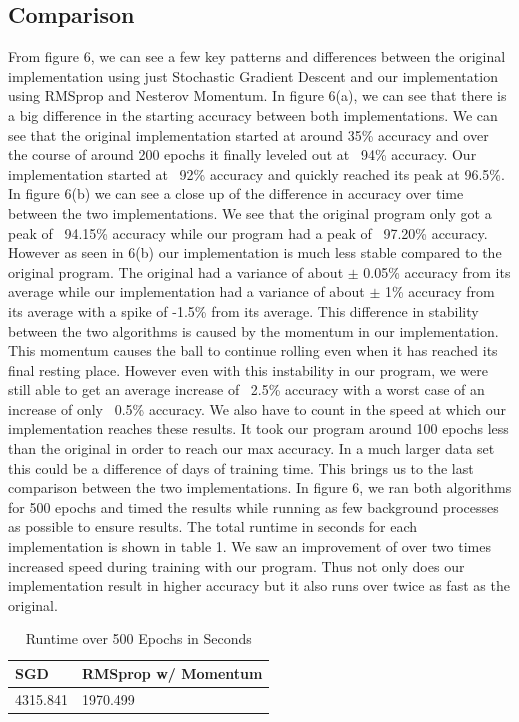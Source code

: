 \documentclass[12pt]{article}
\theoremstyle{definition}
\theoremstyle{plain}
\begin{document}
\subsection{Comparison}
From figure 6, we can see a few key patterns and differences between the original implementation using just Stochastic Gradient Descent and our implementation using RMSprop and Nesterov Momentum. In figure 6(a), we can see that there is a big difference in the starting accuracy between both implementations. We can see that the original implementation started at around 35\% accuracy and over the course of around 200 epochs it finally leveled out at ~94\% accuracy. Our implementation started at ~92\% accuracy and quickly reached its peak at 96.5\%. In figure 6(b) we can see a close up of the difference in accuracy over time between the two implementations. We see that the original program only got a peak of ~94.15\% accuracy while our program had a peak of ~97.20\% accuracy. However as seen in 6(b) our implementation is much less stable compared to the original program. The original had a variance of about $\pm$ 0.05\% accuracy from its average while our implementation had a variance of about $\pm$ 1\% accuracy from its average with a spike of -1.5\% from its average. This difference in stability between the two algorithms is caused by the momentum in our implementation. This momentum causes the ball to continue rolling even when it has reached its final resting place. However even with this instability in our program, we were still able to get an average increase of ~2.5\% accuracy with a worst case of an increase of only ~0.5\% accuracy. We also have to count in the speed at which our implementation reaches these results. It took our program around 100 epochs less than the original in order to reach our max accuracy. In a much larger data set this could be a difference of days of training time. This brings us to the last comparison between the two implementations. In figure 6, we ran both algorithms for 500 epochs and timed the results while running as few background processes as possible to ensure results. The total runtime in seconds for each implementation is shown in table 1. We saw an improvement of over two times increased speed during training with our program. Thus not only does our implementation result in higher accuracy but it also runs over twice as fast as the original. 
\begin{table}
\caption{Runtime over 500 Epochs in Seconds}
\begin{center}
\begin{tabular}{p{}|p{}}
SGD & RMSprop w/ Momentum\\
\hline
4315.841 & 1970.499\\
\end{tabular}
\end{center}
\end{table}
\end{document}
